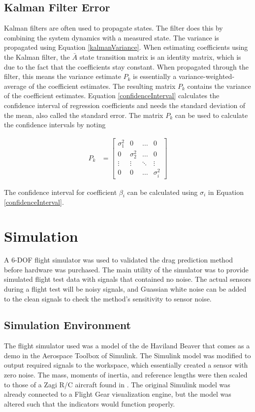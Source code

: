 \documentclass[12pt]{ucthesis}
\begin{document}
\section{Kalman Filter Error}
Kalman filters are often used to propagate states. The filter does this by combining the system dynamics with a measured state. The variance is propagated using Equation \ref{kalmanVariance}. When estimating coefficients using the Kalman filter, the $\bar{A}$ state transition matrix is an identity matrix, which is due to the fact that the coefficients stay constant. When propagated through the filter, this means the variance estimate $P_k$ is essentially a variance-weighted-average of the coefficient estimates. The resulting matrix $P_k$ contains the variance of the coefficient estimates. Equation \ref{confidenceInterval} calculates the confidence interval of regression coefficients and needs the standard deviation of the mean, also called the standard error. The matrix $P_k$ can be used  to calculate the confidence intervals by noting

\begin{align}
P_k &= \begin{bmatrix}
\sigma_{1}^2 &  0  & \ldots & 0\\
0  &  \sigma_{2}^2 & \ldots & 0\\
\vdots & \vdots & \ddots & \vdots\\
0  &   0       &\ldots & \sigma_i^2
\end{bmatrix}
\end{align}

The confidence interval for coefficient $\beta_i$ can be calculated using $\sigma_i$ in Equation \ref{confidenceInterval}.

\chapter{Simulation}
\label{simulation}
A 6-DOF flight simulator was used to validated the drag prediction method before hardware was purchased. The main utility of the simulator was to provide simulated flight test data with signals that contained no noise. The actual sensors during a flight test will be noisy signals, and Guassian white noise can be added to the clean signals to check the method's sensitivity to sensor noise.

\section{Simulation Environment}
The flight simulator used was a model of the de Haviland Beaver that comes as a demo in the Aerospace Toolbox of Simulink. The Simulink model was modified to output required signals to the workspace, which essentially created a sensor with zero noise. The mass, moments of inertia, and reference lengths were then scaled to those of a Zagi R/C aircraft found in \cite{stevens2003aircraft}. The original Simulink model was already connected to a Flight Gear visualization engine, but the model was altered such that the indicators would function properly.
\end{document}
